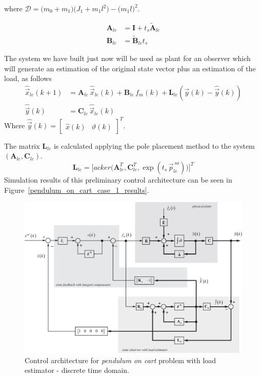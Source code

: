 \documentclass[11pt,a4paper,oneside]{book}
\numberwithin{equation}{section}
\theoremstyle{it}
\theoremstyle{definition}
\begin{document}
where $\mathcal{D}=\big(m_0+m_1\big)\big(J_1+m_1l^2\big)-\big(m_1l\big)^2$.

\begin{equation}
	\begin{aligned}
		\mathbf{A}_{le}  &= \mathbf{I}+t_s\tilde{\mathbf{A}}_{le} \\[6pt]
		\mathbf{B}_{le}  &= \tilde{\mathbf{B}}_{le}t_s
	\end{aligned}
\end{equation}

The system we have built just now will be used as plant for an observer which will generate an estimation of the original state vector plus an estimation of the load, as follows
\begin{equation}
	\begin{aligned}
		\hat{\vec{x}}_{le}(k+1)  &= \mathbf{A}_{le} \,\hat{\vec{x}}_{le}(k) +\mathbf{B}_{le} 
		\,f_m(k)+\mathbf{L}_{le} \left( \vec{y}(k) - \hat{\vec{y}}(k) \right)  
		\\[6pt]
		\hat{\vec{y}}(k)  &= \mathbf{C}_{le} \,\hat{\vec{x}}_{le}(k)
	\end{aligned}
\end{equation}
Where $\hat{\vec{y}}(k)=\begin{bmatrix}
	\hat{x}(k) & \hat{\vartheta}(k)
\end{bmatrix}^T$.

The matrix $\mathbf{L}_{le}$ is calculated applying the pole placement method to the 
system $(\mathbf{A}_{le},\mathbf{C}_{le})$.
\begin{equation}
	\mathbf{L}_{le} = 
	\Bigg[acker\Big(\mathbf{A}_{le}^T,\mathbf{C}_{le}^T,\exp(t_s\,\vec{p}_{le}^{\,so})\Big)\Bigg]^T
\end{equation}
Simulation results of this preliminary control architecture can be seen in Figure~\ref{pendulum_on_cart_case_1_results}.

\begin{figure}[H]
	\centering
	\includegraphics[width = 475pt, 
	keepaspectratio,angle=0]{figures/pendulum_on_cart/servo_pendulum_on_cart_with_load_estimator.eps}
	\captionsetup{width=0.5\textwidth, font=small}		
	\caption{Control architecture for \textit{pendulum on cart} problem with load estimator - discrete time domain.}
	\label{figure_pendulum_on_cart_3}
\end{figure}
\end{document}
